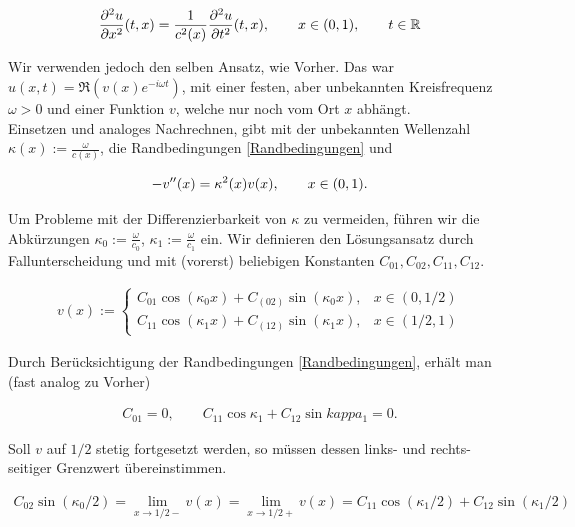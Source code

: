 \begin{align*}
  \frac{\partial^2 u}{\partial x^2} (t, x) =
  \frac{1}{c^2(x)}
  \frac{\partial^2 u}{\partial t^2} (t, x), \qquad
  x \in (0, 1), \qquad
  t \in \mathbb{R}
\end{align*}

Wir verwenden jedoch den selben Ansatz, wie Vorher. Das war $u(x, t) = \mathfrak{R} (v(x) e^{-i \omega t})$, mit einer festen, aber unbekannten Kreisfrequenz $\omega > 0$ und einer Funktion $v$, welche nur noch vom Ort $x$ abhängt. \\

Einsetzen und analoges Nachrechnen, gibt mit der unbekannten Wellenzahl $\kappa(x) := \frac{\omega}{c(x)}$, die Randbedingungen \eqref{Randbedingungen} und

\begin{align} \label{Helmholz-Gleichung}
  -v^{\prime \prime}(x) = \kappa^2(x) v(x), \qquad
  x \in (0, 1).
\end{align}

Um Probleme mit der Differenzierbarkeit von $\kappa$ zu vermeiden, führen wir die Abkürzungen $\kappa_0 := \frac{\omega}{c_0}$, $\kappa_1 := \frac{\omega}{c_1}$ ein. Wir definieren den Lösungsansatz durch Fallunterscheidung und mit (vorerst) beliebigen Konstanten $C_{01}, C_{02}, C_{11}, C_{12}$.

\begin{align*}
  v(x) :=
  \begin{cases}
    C_{01} \cos{(\kappa_0 x)} + C_{(02)} \sin{(\kappa_0 x)},
    & x \in (0, 1/2) \\
    C_{11} \cos{(\kappa_1 x)} + C_{(12)} \sin{(\kappa_1 x)},
    & x \in (1/2, 1)
  \end{cases}
\end{align*}

Durch Berücksichtigung der Randbedingungen \eqref{Randbedingungen}, erhält man (fast analog zu Vorher)

\begin{align*}
  C_{01} = 0, \qquad
  C_{11} \cos{\kappa_1} + C_{12} \sin{kappa_1} = 0.
\end{align*}

Soll $v$ auf $1/2$ stetig fortgesetzt werden, so müssen dessen links- und rechts-seitiger Grenzwert übereinstimmen.

\begin{align*}
  C_{02} \sin(\kappa_0/2)
  = \lim_{x \to 1/2-} v(x)
  = \lim_{x \to 1/2+} v(x)
  = C_{11} \cos(\kappa_1/2) + C_{12} \sin(\kappa_1/2)
\end{align*}

